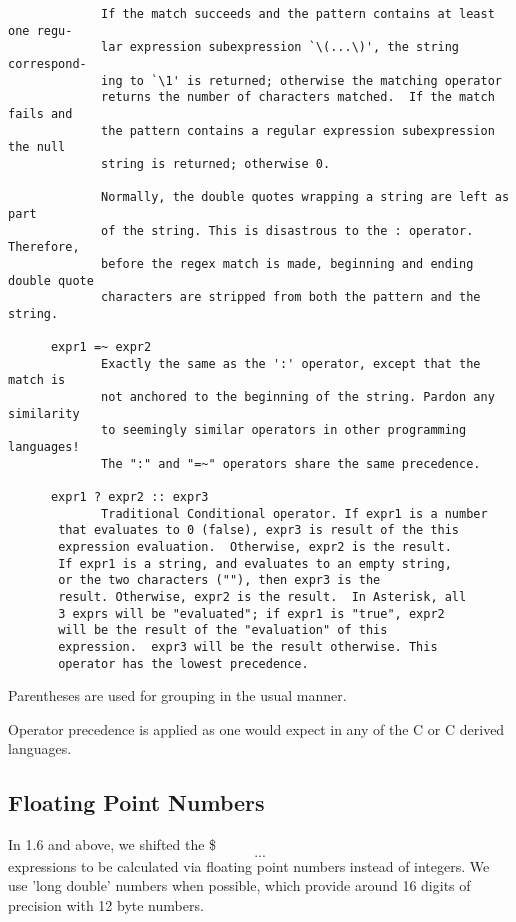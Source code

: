 \begin{verbatim}
             If the match succeeds and the pattern contains at least one regu-
             lar expression subexpression `\(...\)', the string correspond-
             ing to `\1' is returned; otherwise the matching operator
             returns the number of characters matched.  If the match fails and
             the pattern contains a regular expression subexpression the null
             string is returned; otherwise 0.

             Normally, the double quotes wrapping a string are left as part
             of the string. This is disastrous to the : operator. Therefore,
             before the regex match is made, beginning and ending double quote
             characters are stripped from both the pattern and the string.

      expr1 =~ expr2
             Exactly the same as the ':' operator, except that the match is
             not anchored to the beginning of the string. Pardon any similarity
             to seemingly similar operators in other programming languages!
             The ":" and "=~" operators share the same precedence.

      expr1 ? expr2 :: expr3
             Traditional Conditional operator. If expr1 is a number
       that evaluates to 0 (false), expr3 is result of the this
       expression evaluation.  Otherwise, expr2 is the result.
       If expr1 is a string, and evaluates to an empty string,
       or the two characters (""), then expr3 is the
       result. Otherwise, expr2 is the result.  In Asterisk, all
       3 exprs will be "evaluated"; if expr1 is "true", expr2
       will be the result of the "evaluation" of this
       expression.  expr3 will be the result otherwise. This
       operator has the lowest precedence.
\end{verbatim}

Parentheses are used for grouping in the usual manner.

Operator precedence is applied as one would expect in any of the C
or C derived languages.

\subsection{Floating Point Numbers}

In 1.6 and above, we shifted the \$\[...\] expressions to be calculated
via floating point numbers instead of integers. We use 'long double' numbers
when possible, which provide around 16 digits of precision with 12 byte numbers. 

